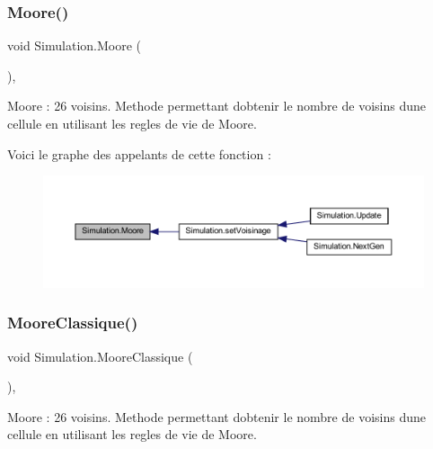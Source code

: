 \subsubsection{\texorpdfstring{Moore()}{Moore()}}
{\footnotesize\ttfamily void Simulation.\+Moore (\begin{DoxyParamCaption}{ }\end{DoxyParamCaption})\hspace{0.3cm}{\ttfamily [inline]}, {\ttfamily [private]}}



Moore \+: 26 voisins. Methode permettant d\textquotesingle{}obtenir le nombre de voisins d\textquotesingle{}une cellule en utilisant les regles de vie de Moore. 

Voici le graphe des appelants de cette fonction \+:
\nopagebreak
\begin{figure}[H]
\begin{center}
\leavevmode
\includegraphics[width=350pt]{class_simulation_aad224ef6c13fac45281cf6c095c5c874_icgraph}
\end{center}
\end{figure}
\mbox{\label{class_simulation_a39f92768aa24cee944387315749314ad}} 
\subsubsection{\texorpdfstring{Moore\+Classique()}{MooreClassique()}}
{\footnotesize\ttfamily void Simulation.\+Moore\+Classique (\begin{DoxyParamCaption}{ }\end{DoxyParamCaption})\hspace{0.3cm}{\ttfamily [inline]}, {\ttfamily [private]}}



Moore \+: 26 voisins. Methode permettant d\textquotesingle{}obtenir le nombre de voisins d\textquotesingle{}une cellule en utilisant les regles de vie de Moore. 

